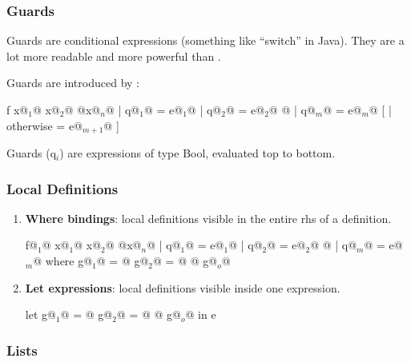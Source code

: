 \subsubsection{Guards}

Guards are conditional expressions (something like ``switch'' in Java).
They are a lot more readable and more powerful than .

Guards are introduced by \codeline{|}:\\
\begin{Haskell}
f x@$_1$@ x@$_2$@ @\dots@ x@$_n$@
  | q@$_1$@     = e@$_1$@
  | q@$_2$@     = e@$_2$@
  @\dots@
  | q@$_m$@     = e@$_m$@
[ | otherwise   = e@$_{m+1}$@ ]
\end{Haskell}

Guards (q$_i$) are expressions of type Bool, evaluated top to bottom.


\subsubsection{Local Definitions}

\begin{enumerate}
  \item \textbf{Where bindings}: local definitions visible in the entire rhs of a definition.\\
  \begin{Haskell}
f@$_1$@ x@$_1$@ x@$_2$@ @\dots@ x@$_n$@ | q@$_1$@ = e@$_1$@
                    | q@$_2$@ = e@$_2$@ 
                    @\dots@
                    | q@$_m$@ = e@$_m$@ 
	where 
		g@$_1$@ = @\dots@
		g@$_2$@ = @\dots@
		@\dots@
		g@$_o$@
  \end{Haskell}


  \item \textbf{Let expressions}: local definitions visible inside one expression.\\
  \begin{Haskell}
let g@$_1$@ = @\dots@
    g@$_2$@ = @\dots@
    @\dots@
    g@$_o$@
in e
  \end{Haskell}
\end{enumerate}

\subsubsection{Lists}

